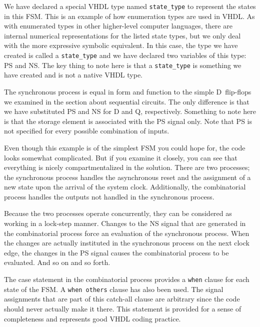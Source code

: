\begin{my_list}
\item We have declared a special VHDL type named \texttt{state\_type} to represent the states in this FSM. This is an example of how enumeration types are used in VHDL. As with enumerated types in other higher-level computer languages, there are internal numerical representations for the listed state types, but we only deal with the more expressive symbolic equivalent. In this case, the type we have created is called a \texttt{state\_type} and we have declared two variables of this type: PS and NS. The key thing to note here is that a \texttt{state\_type} is something we have created and is not a native VHDL type.

\item The synchronous process is equal in form and function to the simple D~flip-flops we examined in the section about sequential circuits. The only difference is that we have substituted PS and NS for D and Q, respectively. Something to note here is that the storage element is associated with the PS signal only. Note that PS is not specified for every possible combination of inputs.

\item Even though this example is of the simplest FSM you could hope for, the code looks somewhat complicated. But if you examine it closely, you can see that everything is nicely compartmentalized in the solution. There are two processes; the synchronous process handles the asynchronous reset and the assignment of a new state upon the arrival of the system clock. Additionally, the combinatorial process handles the outputs not handled in the synchronous process.

\item Because the two processes operate concurrently, they can be considered as working in a lock-step manner. Changes to the NS signal that are generated in the combinatorial process force an evaluation of the synchronous process. When the changes are actually instituted in the synchronous process on the next clock edge, the changes in the PS signal causes the combinatorial process to be evaluated. And so on and so forth.

\item The case statement in the combinatorial process provides a \texttt{when} clause for each state of the FSM. A \texttt{when others} clause has also been used. The signal assignments that are part of this catch-all clause are arbitrary since the code should never actually make it there. This statement is provided for a sense of completeness and represents good VHDL coding practice.


\end{my_list}
